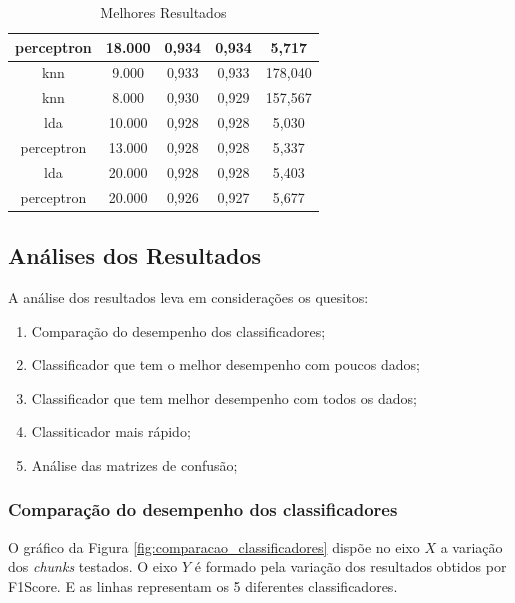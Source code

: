 \documentclass[12pt]{article}
\begin{document}
\begin{table}[!htb]
\begin{tabular}{|c|c|c|c|c|}
perceptron          & 18.000         & 0,934            & 0,934             & 5,717                       \\ \hline
knn                 & 9.000          & 0,933            & 0,933             & 178,040                     \\ \hline
knn                 & 8.000          & 0,930            & 0,929             & 157,567                     \\ \hline
lda                 & 10.000         & 0,928            & 0,928             & 5,030                       \\ \hline
perceptron          & 13.000         & 0,928            & 0,928             & 5,337                       \\ \hline
lda                 & 20.000         & 0,928            & 0,928             & 5,403                       \\ \hline
perceptron          & 20.000         & 0,926            & 0,927             & 5,677                       \\ \hline
\end{tabular}
  \caption{Melhores Resultados}
  \label{tab:resultados_melhores}
\end{table}

\subsection{Análises dos Resultados}

A análise dos resultados leva em considerações os quesitos:

\begin{enumerate}
  \item Comparação do desempenho dos classificadores;
  \item Classificador que tem o melhor desempenho com poucos dados;
  \item Classificador que tem melhor desempenho com todos os dados;
  \item Classiticador mais rápido;
  \item Análise das matrizes de confusão;
\end{enumerate}

\subsubsection{Comparação do desempenho dos classificadores}

O gráfico da Figura \ref{fig:comparacao_classificadores} dispõe no eixo $X$ a variação dos \textit{chunks} testados. O eixo $Y$ é formado pela variação dos resultados obtidos por F1Score. E as linhas representam os 5 diferentes classificadores.
\end{document}
